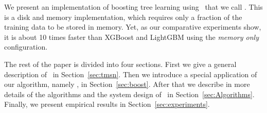 We present an implementation of boosting tree learning using
\tmsn\ that we call \Sparrow. This is a disk and memory
implementation, which requires only a fraction of the training data to
be stored in memory.  Yet, as our comparative experiments show, it is
about 10 times faster than XGBoost and LightGBM using the {\em memory
  only} configuration.

The rest of the paper is divided into four sections.
First we give a general description of \tmsn\ in Section~\ref{sec:tmsn}.
Then we introduce a special application of our algorithm, namely \Sparrow, in Section~\ref{sec:boost}.
After that we describe in more details of the algorithms and the system design of \Sparrow\ in
Section~\ref{sec:Algorithms}.
Finally, we present empirical results in Section~\ref{sec:experiments}.
